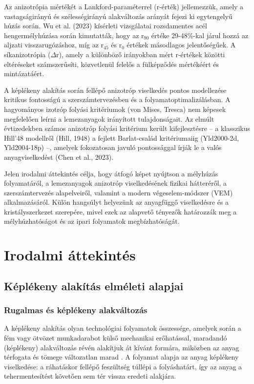 \documentclass[12pt,a4paper,oneside]{report}
\begin{document}
Az anizotrópia mértékét a Lankford-paraméterrel (r-érték) jellemezzük, amely a vastagságirányú és szélességirányú alakváltozás arányát fejezi ki egytengelyű húzás során. Wu et al. (2023) kísérleti vizsgálatai rozsdamentes acél hengermélyhúzása során kimutatták, hogy az r$_{90}$ értéke 29-48\%-kal járul hozzá az aljzati visszarugózáshoz, míg az r$_{45}$ és r$_{0}$ értékek másodlagos jelentőségűek. A síkanizotrópia ($\Delta$r), amely a különböző irányokban mért r-értékek közötti eltéréseket számszerűsíti, közvetlenül felelős a fülképződés mértékéért és mintázatáért.

A képlékeny alakítás során fellépő anizotróp viselkedés pontos modellezése kritikus fontosságú a szerszámtervezésben és a folyamatoptimalizálásban. A hagyományos izotróp folyási kritériumok (von Mises, Tresca) nem képesek megfelelően leírni a lemezanyagok irányított tulajdonságait. Az elmúlt évtizedekben számos anizotróp folyási kritérium került kifejlesztésre – a klasszikus Hill'48 modellről (Hill, 1948) a fejlett Barlat-család kritériumaiig (Yld2000-2d, Yld2004-18p) –, amelyek fokozatosan javuló pontossággal írják le a valós anyagviselkedést (Chen et al., 2023).

Jelen irodalmi áttekintés célja, hogy átfogó képet nyújtson a mélyhúzás folyamatáról, a lemezanyagok anizotróp viselkedésének fizikai hátteréről, a szerszámtervezés alapelveiről, valamint a modern végeselem-módszer (VEM) alkalmazásáról. Külön hangsúlyt helyezünk az anyagfüggő viselkedésre és a kristályszerkezet szerepére, mivel ezek az alapvető tényezők határozzák meg a mélyhúzhatóságot és az ipari folyamatok megbízhatóságát.

\chapter{Irodalmi áttekintés}

\section{Képlékeny alakítás elméleti alapjai}
\subsection{Rugalmas és képlékeny alakváltozás}

A képlékeny alakítás olyan technológiai folyamatok összessége, amelyek során a fém vagy ötvözet munkadarabot külső mechanikai erőhatással, maradandó (képlékeny) alakváltozás révén alakítjuk át kívánt formára, miközben az anyag térfogata és tömege változatlan marad \cite{Gillemot1977}. A folyamat alapja az anyag képlékeny viselkedése: a ráhatáskor fellépő feszültség túllépi a folyáshatárt, így az anyag a tehermentesítést követően sem tér vissza eredeti alakjára.
\end{document}
